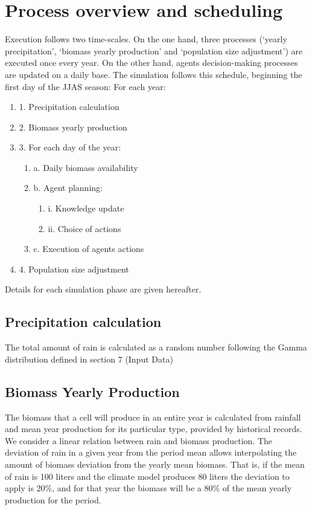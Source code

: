 \documentclass[11pt,oneside,a4paper,openright]{report}
\begin{document}
\section{Process overview and scheduling}

Execution follows two time-scales. On the one hand, three processes (‘yearly precipitation’, ‘biomass
yearly production’ and ‘population size adjustment’) are executed once every year. On the other hand,
agents decision-making processes are updated on a daily base. The simulation follows this schedule,
beginning the first day of the JJAS season:
For each year:
\begin{enumerate}
	\item 1. Precipitation calculation
	\item 2. Biomass yearly production
	\item 3. For each day of the year:
	\begin{enumerate}
		\item a. Daily biomass availability
		\item b. Agent planning:
		\begin{enumerate}
			\item i. Knowledge update
			\item ii. Choice of actions
		\end{enumerate}
		\item c. Execution of agents actions
	\end{enumerate}
	\item 4. Population size adjustment
\end{enumerate}


Details for each simulation phase are given hereafter.


\subsection{Precipitation calculation}
The total amount of rain is calculated as a random number following the Gamma distribution defined in
section 7 (Input Data)
\subsection{Biomass Yearly Production}
The biomass that a cell will produce in an entire year is calculated from rainfall and mean year
production for its particular type, provided by historical records.
We consider a linear relation between rain and biomass production. The deviation of rain in a given
year from the period mean allows interpolating the amount of biomass deviation from the yearly mean
biomass. That is, if the mean of rain is 100 liters and the climate model produces 80 liters the deviation
to apply is 20\%, and for that year the biomass will be a 80\% of the mean yearly production for the
period.
\end{document}
